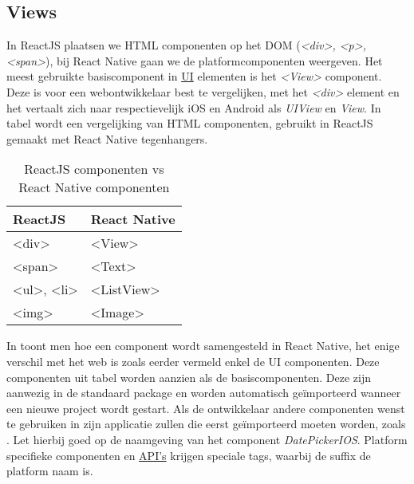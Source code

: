 \subsection{Views}
In ReactJS plaatsen we HTML componenten op het DOM (\emph{<div>, <p>, <span>}), bij React Native gaan we de platformcomponenten weergeven. Het meest gebruikte basiscomponent in \hyperref[ui]{UI} elementen is het \emph{<View>} component. Deze is voor een webontwikkelaar best te vergelijken, met het \emph{<div>} element en het vertaalt zich naar respectievelijk iOS en Android als \emph{UIView} en \emph{View}. 
In tabel  wordt een vergelijking van HTML componenten, gebruikt in ReactJS gemaakt met React Native tegenhangers. 


\begin{table}
		\scriptsize
		\centering
\begin{tabular}{ ll }
  \toprule
ReactJS & React Native \\
  \midrule
<div>	&	<View> \\
<span> & <Text> \\
<ul>, <li> & <ListView> \\
<img> & <Image> \\
  \bottomrule
\end{tabular}
\caption{ReactJS componenten vs React Native componenten}
\label{table:componenten}
\end{table}

In   toont men hoe een component wordt samengesteld in React Native, het enige verschil met het web is zoals eerder vermeld enkel de UI componenten. Deze componenten uit tabel  worden aanzien als de basiscomponenten. Deze zijn aanwezig in de standaard package en worden automatisch geïmporteerd wanneer een nieuwe project wordt gestart. Als de ontwikkelaar andere componenten wenst te gebruiken in zijn applicatie zullen die eerst geïmporteerd moeten worden, zoals . Let hierbij goed op de naamgeving van het component \emph{DatePickerIOS}. Platform specifieke componenten en \hyperref[api]{API's} krijgen speciale tags, waarbij de suffix de platform naam is. 

